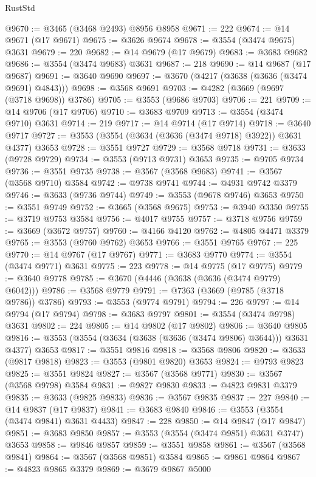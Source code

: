 \begin{lexlean}{RustStd}
\begin{coremodule}
@9670 := @3465 (@3468 @2493) @8956 @8958
@9671 := 222
@9674 := @14 @9671 (@17 @9671)
@9675 := @3626 @9674
@9678 := @3554 (@3474 @9675) @3631
@9679 := 220
@9682 := @14 @9679 (@17 @9679)
@9683 := @3683 @9682
@9686 := @3554 (@3474 @9683) @3631
@9687 := 218
@9690 := @14 @9687 (@17 @9687)
@9691 := @3640 @9690
@9697 := @3670 (@4217 (@3638 (@3636 (@3474 @9691) @4843)))
@9698 := @3568 @9691
@9703 := @4282 (@3669 (@9697 (@3718 @9698)) @3786)
@9705 := @3553 (@9686 @9703)
@9706 := 221
@9709 := @14 @9706 (@17 @9706)
@9710 := @3683 @9709
@9713 := @3554 (@3474 @9710) @3631
@9714 := 219
@9717 := @14 @9714 (@17 @9714)
@9718 := @3640 @9717
@9727 := @3553 (@3554 (@3634 (@3636 (@3474 @9718) @3922)) @3631 @4377) @3653
@9728 := @3551 @9727
@9729 := @3568 @9718
@9731 := @3633 (@9728 @9729)
@9734 := @3553 (@9713 @9731) @3653
@9735 := @9705 @9734
@9736 := @3551 @9735
@9738 := @3567 (@3568 @9683)
@9741 := @3567 (@3568 @9710) @3584
@9742 := @9738 @9741
@9744 := @4931 @9742 @3379
@9746 := @3633 (@9736 @9744)
@9749 := @3553 (@9678 @9746) @3653
@9750 := @3551 @9749
@9752 := @3665 (@3568 @9675)
@9753 := @3940 @3350
@9755 := @3719 @9753 @3584
@9756 := @4017 @9755
@9757 := @3718 @9756
@9759 := @3669 (@3672 @9757)
@9760 := @4166 @4120
@9762 := @4805 @4471 @3379
@9765 := @3553 (@9760 @9762) @3653
@9766 := @3551 @9765
@9767 := 225
@9770 := @14 @9767 (@17 @9767)
@9771 := @3683 @9770
@9774 := @3554 (@3474 @9771) @3631
@9775 := 223
@9778 := @14 @9775 (@17 @9775)
@9779 := @3640 @9778
@9785 := @3670 (@4446 (@3638 (@3636 (@3474 @9779) @6042)))
@9786 := @3568 @9779
@9791 := @7363 (@3669 (@9785 (@3718 @9786)) @3786)
@9793 := @3553 (@9774 @9791)
@9794 := 226
@9797 := @14 @9794 (@17 @9794)
@9798 := @3683 @9797
@9801 := @3554 (@3474 @9798) @3631
@9802 := 224
@9805 := @14 @9802 (@17 @9802)
@9806 := @3640 @9805
@9816 := @3553 (@3554 (@3634 (@3638 (@3636 (@3474 @9806) @3644))) @3631 @4377) @3653
@9817 := @3551 @9816
@9818 := @3568 @9806
@9820 := @3633 (@9817 @9818)
@9823 := @3553 (@9801 @9820) @3653
@9824 := @9793 @9823
@9825 := @3551 @9824
@9827 := @3567 (@3568 @9771)
@9830 := @3567 (@3568 @9798) @3584
@9831 := @9827 @9830
@9833 := @4823 @9831 @3379
@9835 := @3633 (@9825 @9833)
@9836 := @3567 @9835
@9837 := 227
@9840 := @14 @9837 (@17 @9837)
@9841 := @3683 @9840
@9846 := @3553 (@3554 (@3474 @9841) @3631 @4433)
@9847 := 228
@9850 := @14 @9847 (@17 @9847)
@9851 := @3683 @9850
@9857 := @3553 (@3554 (@3474 @9851) @3631 @3747) @3653
@9858 := @9846 @9857
@9859 := @3551 @9858
@9861 := @3567 (@3568 @9841)
@9864 := @3567 (@3568 @9851) @3584
@9865 := @9861 @9864
@9867 := @4823 @9865 @3379
@9869 := @3679 @9867 @5000

\end{coremodule}
\end{lexlean}
